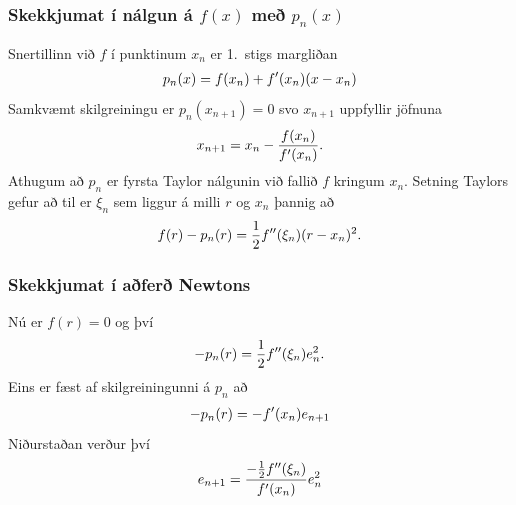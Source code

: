 \documentclass[a4paper,10pt,icelandic]{sphinxmanual}
\begin{document}
\subsubsection{Skekkjumat í nálgun á \(f(x)\) með \(p_n(x)\)}
\label{kafli02:id6}
Snertillinn við \(f\) í punktinum \(x_n\) er 1. stigs margliðan
\begin{gather}
\begin{split}p_n(x) = f(x_n) + f'(x_n)(x-x_n)\end{split}\notag
\end{gather}
Samkvæmt skilgreiningu er \(p_n(x_{n+1}) = 0\) svo \(x_{n+1}\)
uppfyllir jöfnuna
\begin{gather}
\begin{split}x_{n+1} = x_n - \frac{f(x_n)}{f'(x_n)}.\end{split}\notag
\end{gather}
Athugum að \(p_n\) er fyrsta Taylor nálgunin við fallið \(f\)
kringum \(x_n\). Setning Taylors gefur að til er \(\xi_n\) sem
liggur á milli \(r\) og \(x_n\) þannig að
\begin{gather}
\begin{split}f(r) - p_n(r) = \frac{1}{2}f''(\xi_n)(r-x_n)^2.\end{split}\notag
\end{gather}

\subsubsection{Skekkjumat í aðferð Newtons}
\label{kafli02:skekkjumat-i-afer-newtons}
Nú er \(f(r) = 0\) og því
\begin{gather}
\begin{split}-p_n(r) = \frac{1}{2}f''(\xi_n)e_n^2.\end{split}\notag
\end{gather}
Eins er fæst af skilgreiningunni á \(p_n\) að
\begin{gather}
\begin{split}-p_n(r) = -f'(x_n)e_{n+1}\end{split}\notag
\end{gather}
Niðurstaðan verður því
\begin{gather}
\begin{split}e_{n+1} = \frac{-\frac{1}{2}f''(\xi_n)}
        {f'(x_n)}e_n^2\end{split}\notag
\end{gather}
\end{document}
